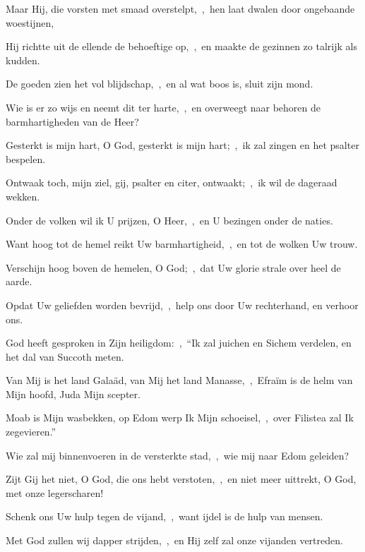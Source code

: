 \documentclass[12pt,twoside,a5paper]{article}
\begin{document}
\begin{halfparskip}
  Maar Hij, die vorsten met smaad overstelpt,~\sep\ hen laat dwalen door ongebaande woestijnen,

  Hij richtte uit de ellende de behoeftige op,~\sep\ en maakte de gezinnen zo talrijk als kudden.

  De goeden zien het vol blijdschap,~\sep\ en al wat boos is, sluit zijn mond.

  Wie is er zo wijs en neemt dit ter harte,~\sep\ en overweegt naar behoren de barmhartigheden van de Heer?

   Gesterkt is mijn hart, O God, gesterkt is mijn hart;~\sep\ ik zal zingen en het psalter bespelen.

  Ontwaak toch, mijn ziel, gij, psalter en citer, ontwaakt;~\sep\ ik wil de dageraad wekken.

  Onder de volken wil ik U prijzen, O Heer,~\sep\ en U bezingen onder de naties.

  Want hoog tot de hemel reikt Uw barmhartigheid,~\sep\ en tot de wolken Uw trouw.

  Verschijn hoog boven de hemelen, O God;~\sep\ dat Uw glorie strale over heel de aarde.

  Opdat Uw geliefden worden bevrijd,~\sep\ help ons door Uw rechterhand, en verhoor ons.

  God heeft gesproken in Zijn heiligdom:~\sep\ ``Ik zal juichen en Sichem verdelen, en het dal van Succoth meten.

  Van Mij is het land Galaäd, van Mij het land Manasse,~\sep\ Efraïm is de helm van Mijn hoofd, Juda Mijn scepter.

  Moab is Mijn wasbekken, op Edom werp Ik Mijn schoeisel,~\sep\ over Filistea zal Ik zegevieren.''

  Wie zal mij binnenvoeren in de versterkte stad,~\sep\ wie mij naar Edom geleiden?

  Zijt Gij het niet, O God, die ons hebt verstoten,~\sep\ en niet meer uittrekt, O God, met onze legerscharen!

  Schenk ons Uw hulp tegen de vijand,~\sep\ want ijdel is de hulp van mensen.

  Met God zullen wij dapper strijden,~\sep\ en Hij zelf zal onze vijanden vertreden.
\end{halfparskip}
\end{document}
